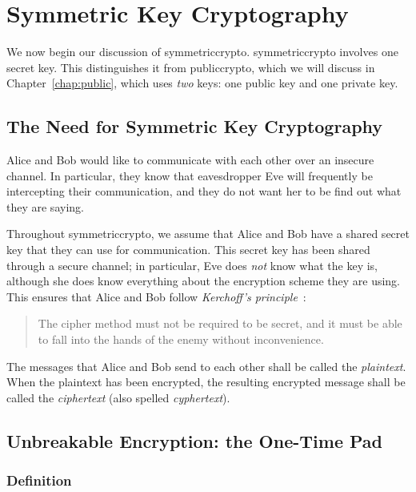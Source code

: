 \chapter{Symmetric Key Cryptography}
\label{chap:symmetric}

We now begin our discussion of \gls{symmetriccrypto}.
\Gls{symmetriccrypto} involves one secret key.
This distinguishes it from \gls{publiccrypto}, which we will
discuss in Chapter~\ref{chap:public}, which uses \emph{two} keys:
one public key and one private key.



\section{The Need for Symmetric Key Cryptography}

Alice and Bob would like to communicate with each other
over an \gls{insecure channel}.
In particular, they know that eavesdropper Eve will frequently
be intercepting their communication,
and they do not want her to be find out what they are saying.

Throughout \gls{symmetriccrypto}, we assume that Alice and Bob
have a shared secret key that they can use for communication.
This secret key has been shared through a \gls{secure channel};
in particular, Eve does \emph{not} know what the key is,
although she does know everything about the \gls{encryption scheme}
they are using.
This ensures that Alice and Bob follow
\emph{Kerchoff's principle}~\cite[Page 5]{IntroModernCrypto}:

\begin{quote}
    The cipher method must not be required to be secret,
    and it must be able to fall into the hands of the enemy
    without inconvenience.
\end{quote}

\noindent
The messages that Alice and Bob send to each other shall be called
the \emph{plaintext}.
When the plaintext has been encrypted, the resulting encrypted message
shall be called the \emph{ciphertext} (also spelled \emph{cyphertext}).



\section{Unbreakable Encryption: the One-Time Pad}

\subsection{Definition}

